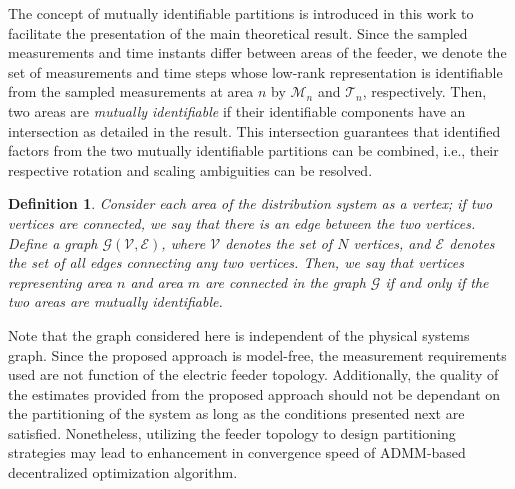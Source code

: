 \documentclass[journal]{IEEEtran}
\newcounter{propose}
\newcounter{thm}
\newcounter{define}
\newtheorem{definition}[define]{Definition}
\newcommand{\revision}[1]{{\color{black} #1}} %
\begin{document}
\revision{The concept of mutually identifiable partitions is introduced in this work to facilitate the presentation of the main theoretical result. Since the sampled measurements and time instants differ between areas of the feeder, we denote the set of measurements and time steps whose low-rank representation is identifiable from the sampled measurements at area $n$ by $\mathcal{M}_n$ and $\mathcal{T}_n$, respectively. Then, two areas are \emph{mutually identifiable} if their identifiable components have an intersection as detailed in the result. This intersection guarantees that identified factors from the two mutually identifiable partitions can be combined, i.e., their respective rotation and scaling ambiguities can be resolved.}

\begin{definition}
Consider each area of the distribution system as a vertex; if two vertices are connected, we say that there is an edge between the two vertices.
Define a graph $\mathcal{G}(\mathcal{V}, \mathcal{E})$, where $\mathcal{V}$ denotes the set of $N$ vertices, and $\mathcal{E}$ denotes the set of all edges connecting any two vertices. %
Then, we say that vertices representing area $n$ and area $m$ are connected in the graph $\mathcal{G}$ if and only if the two areas are mutually identifiable.
\end{definition}

\revision{Note that the graph considered here is independent of the physical systems graph. Since the proposed approach is model-free, the measurement requirements used are not function of the electric feeder topology. Additionally, the quality of the estimates provided from the proposed approach should not be dependant on the partitioning of the system as long as the conditions presented next are satisfied. Nonetheless, utilizing the feeder topology to design partitioning strategies may lead to enhancement in convergence speed of ADMM-based decentralized optimization algorithm.}
\end{document}
